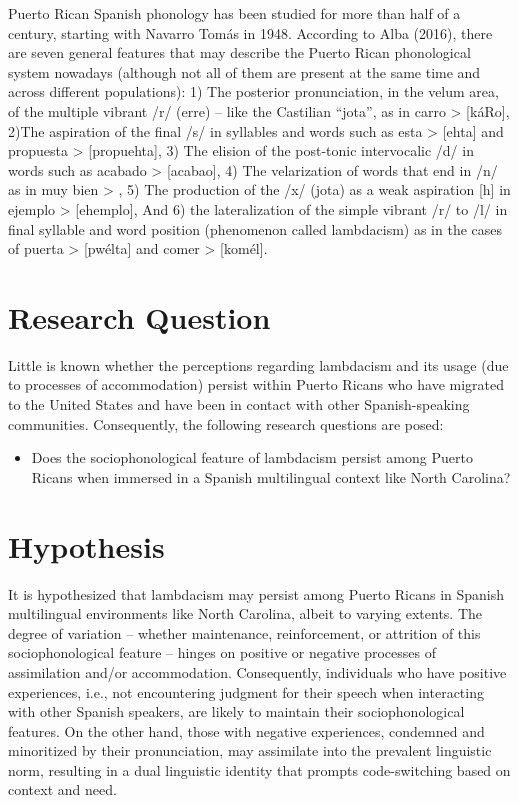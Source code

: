\documentclass[
  a4paper,
  11pt,
  twocolumn]{article}
\providecommand{\tightlist}{%
  \setlength{\itemsep}{0pt}\setlength{\parskip}{0pt}}
\begin{document}
Puerto Rican Spanish phonology has been studied for more than half of a
century, starting with Navarro Tomás in 1948. According to Alba (2016),
there are seven general features that may describe the Puerto Rican
phonological system nowadays (although not all of them are present at
the same time and across different populations): 1) The posterior
pronunciation, in the velum area, of the multiple vibrant /r/ (erre) --
like the Castilian ``jota'', as in carro \textgreater{} {[}káRo{]},
2)The aspiration of the final /s/ in syllables and words such as esta
\textgreater{} {[}ehta{]} and propuesta \textgreater{} {[}propuehta{]},
3) The elision of the post-tonic intervocalic /d/ in words such as
acabado \textgreater{} {[}acabao{]}, 4) The velarization of words that
end in /n/ as in muy bien \textgreater{} , 5) The
production of the /x/ (jota) as a weak aspiration {[}h{]} in ejemplo
\textgreater{} {[}ehemplo{]}, And 6) the lateralization of the simple
vibrant /r/ to /l/ in final syllable and word position (phenomenon
called lambdacism) as in the cases of puerta \textgreater{} {[}pwélta{]}
and comer \textgreater{} {[}komél{]}.

\section{Research Question}

Little is known whether the perceptions regarding lambdacism and its
usage (due to processes of accommodation) persist within Puerto Ricans
who have migrated to the United States and have been in contact with
other Spanish-speaking communities. Consequently, the following research
questions are posed:

\begin{itemize}
\tightlist
\item
  Does the sociophonological feature of lambdacism persist among Puerto
  Ricans when immersed in a Spanish multilingual context like North
  Carolina?
\end{itemize}

\section{Hypothesis}

It is hypothesized that lambdacism may persist among Puerto Ricans in
Spanish multilingual environments like North Carolina, albeit to varying
extents. The degree of variation -- whether maintenance, reinforcement,
or attrition of this sociophonological feature -- hinges on positive or
negative processes of assimilation and/or accommodation. Consequently,
individuals who have positive experiences, i.e., not encountering
judgment for their speech when interacting with other Spanish speakers,
are likely to maintain their sociophonological features. On the other
hand, those with negative experiences, condemned and minoritized by
their pronunciation, may assimilate into the prevalent linguistic norm,
resulting in a dual linguistic identity that prompts code-switching
based on context and need.
\end{document}

